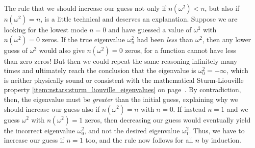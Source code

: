 The rule that we should increase our guess not only if $n(\omega^2) < n$, but also if $n(\omega^2) = n$, is a little technical and deserves an explanation.
Suppose we are looking for the lowest mode $n = 0$ and have guessed a value of $\omega^2$ with $n(\omega^2) = 0$ zeros.
If the true eigenvalue $\omega_n^2$ had been \emph{less} than $\omega^2$, then any lower guess of $\omega^2$ would also give $n(\omega^2) = 0$ zeros, for a function cannot have less than zero zeros!
But then we could repeat the same reasoning infinitely many times and ultimately reach the conclusion that the eigenvalue is $\omega_0^2 = -\infty$, which is neither physically sound or consistent with the mathematical Sturm-Liouville property \ref{item:nstars:sturm_liouville_eigenvalues} on page~\pageref{item:nstars:sturm_liouville_eigenvalues}.
By contradiction, then, the eigenvalue must be \emph{greater} than the initial guess, explaining why we should increase our guess also if $n(\omega^2) = n$ with $n = 0$.
If instead $n = 1$ and we guess $\omega^2$ with $n(\omega^2) = 1$ zeros, then decreasing our guess would eventually yield the incorrect eigenvalue $\omega_0^2$, and not the desired eigenvalue $\omega_1^2$.
Thus, we have to increase our guess if $n=1$ too, and the rule now follows for all $n$ by induction.

